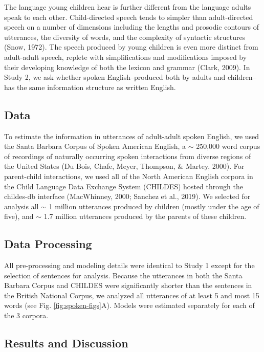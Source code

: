 \documentclass[
  english,
  man,floatsintext]{apa6}
\begin{document}
The language young children hear is further different from the language adults speak to each other. Child-directed speech tends to simpler than adult-directed speech on a number of dimensions including the lengths and prosodic contours of utterances, the diversity of words, and the complexity of syntactic structures (Snow, 1972). The speech produced by young children is even more distinct from adult-adult speech, replete with simplifications and modifications imposed by their developing knowledge of both the lexicon and grammar (Clark, 2009). In Study 2, we ask whether spoken English--produced both by adults and children-- has the same information structure as written English.

\hypertarget{data-1}{%
\subsection{Data}\label{data-1}}

To estimate the information in utterances of adult-adult spoken English, we used the Santa Barbara Corpus of Spoken American English, a \(\sim\) 250,000 word corpus of recordings of naturally occurring spoken interactions from diverse regions of the United States (Du Bois, Chafe, Meyer, Thompson, \& Martey, 2000). For parent-child interactions, we used all of the North American English corpora in the Child Language Data Exchange System (CHILDES) hosted through the childes-db interface (MacWhinney, 2000; Sanchez et al., 2019). We selected for analysis all \(\sim\) 1 million utterances produced by children (mostly under the age of five), and \(\sim\) 1.7 million utterances produced by the parents of these children.

\hypertarget{data-processing}{%
\subsection{Data Processing}\label{data-processing}}

All pre-processing and modeling details were identical to Study 1 except for the selection of sentences for analysis. Because the utterances in both the Santa Barbara Corpus and CHILDES were significantly shorter than the sentences in the British National Corpus, we analyzed all utterances of at least 5 and most 15 words (see Fig. \ref{fig:spoken-figs}A). Models were estimated separately for each of the 3 corpora.

\hypertarget{results-and-discussion-1}{%
\subsection{Results and Discussion}\label{results-and-discussion-1}}
\end{document}
